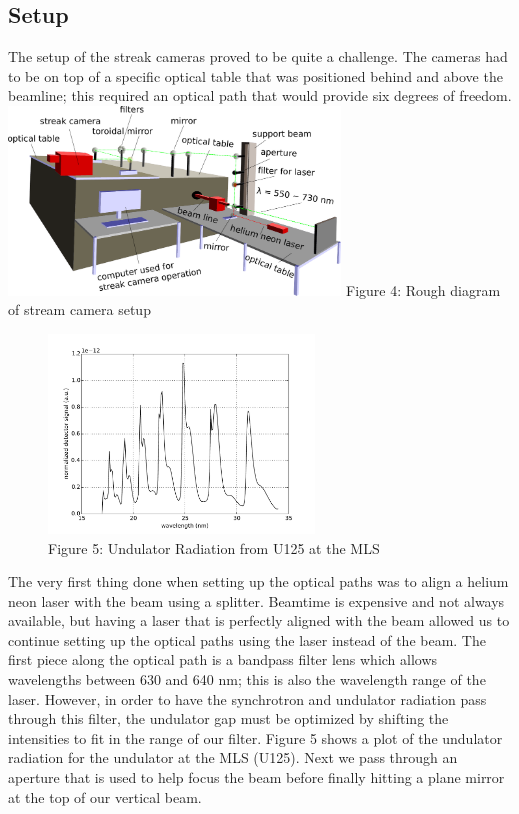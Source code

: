\documentclass[%
 reprint,%
 amssymb, amsmath,%
 aip,cha,%
]{revtex4-1}
\begin{document}
\subsection{Setup\cite{Note3}}
The setup of the streak cameras proved to be quite a challenge. The cameras had to be on top of a specific optical table that was positioned behind and above the beamline; this required an optical path that would provide six degrees of freedom.
\includegraphics[width=250pt]{diagramtext.pdf}
Figure 4: Rough diagram of stream camera setup \\
\begin{figure}
\begin{center}
\includegraphics[width=200pt]{uplot.pdf} \\
Figure 5: Undulator Radiation from U125 at the MLS
\end{center}
\end{figure}
The very first thing done when setting up the optical paths was to align a helium neon laser with the beam using a splitter. Beamtime is expensive and not always available, but having a laser that is perfectly aligned with the beam allowed us to continue setting up the optical paths using the laser instead of the beam. The first piece along the optical path is a bandpass filter lens which allows wavelengths between 630 and 640 nm; this is also the wavelength range of the laser. However, in order to have the synchrotron and undulator radiation pass through this filter, the undulator gap must be optimized by shifting the intensities to fit in the range of our filter. Figure 5 shows a plot of the undulator radiation for the undulator at the MLS (U125). Next we pass through an aperture that is used to help focus the beam before finally hitting a plane mirror at the top of our vertical beam.
\end{document}
